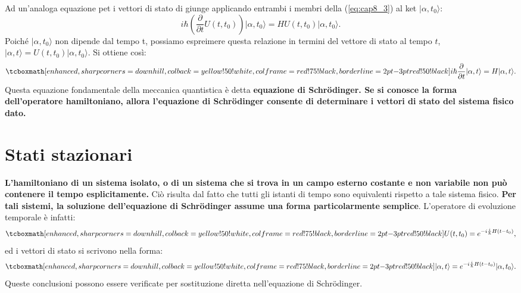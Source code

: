 \documentclass[a4paper,12pt,oneside]{book}
\begin{document}
Ad un'analoga equazione pet i vettori di stato di giunge applicando entrambi i membri della (\ref{eq:cap8_3}) al ket $\vert \alpha, t_0\rangle$:
	\begin{equation}
		i\hbar \left( \frac{\partial}{\partial t} U (t,t_0) \right) \vert \alpha, t_0\rangle= H U(t, t_0)\vert \alpha, t_0\rangle.
	\end{equation}
Poiché $\vert \alpha, t_0\rangle$ non dipende dal tempo t, possiamo espreimere questa relazione in termini del vettore di stato al tempo $t$, $\vert \alpha, t\rangle= U(t,t_0)\vert \alpha, t_0\rangle$. Si ottiene così:
	\begin{equation}
		\tcboxmath[enhanced, sharp corners=downhill, colback=yellow!50!white, colframe=red!75!black, borderline={2pt}{-3pt}{red!50!black}]{
		i\hbar \frac{\partial}{\partial t} \vert \alpha, t \rangle = H \vert \alpha, t \rangle.
		}
	\end{equation}
Questa equazione fondamentale della meccanica quantistica è detta \textbf{equazione di Schr\"{o}dinger. Se si conosce la forma dell'operatore hamiltoniano, allora l'equazione di Schr\"{o}dinger consente di determinare i vettori di stato del sistema fisico dato.}
\section[Stati stazionari]{Stati stazionari}
\textbf{L'hamiltoniano di un sistema isolato, o di un sistema che si trova in un campo esterno costante e non variabile non può contenere il tempo esplicitamente.} Ciò risulta dal fatto che tutti gli istanti di tempo sono equivalenti rispetto a tale sistema fisico. \textbf{Per tali sistemi, la soluzione dell'equazione di Schr\"{o}dinger assume una forma particolarmente semplice}. L'operatore di evoluzione temporale è infatti:
	\begin{equation}
		\tcboxmath[enhanced, sharp corners=downhill, colback=yellow!50!white, colframe=red!75!black, borderline={2pt}{-3pt}{red!50!black}]{
		U(t,t_0)= e^{-i\frac{i}{\hbar}H(t-t_0)},
		}
	\end{equation}
ed i vettori di stato si scrivono nella forma:
	\begin{equation}
		\tcboxmath[enhanced, sharp corners=downhill, colback=yellow!50!white, colframe=red!75!black, borderline={2pt}{-3pt}{red!50!black}]{
			\vert \alpha, t \rangle = e^{-i\frac{i}{\hbar}H(t-t_0)}\vert \alpha, t_0 \rangle.
			}
	\end{equation}
Queste conclusioni possono essere verificate per sostituzione diretta nell'equazione di Schr\"{o}dinger.\\
\end{document}
